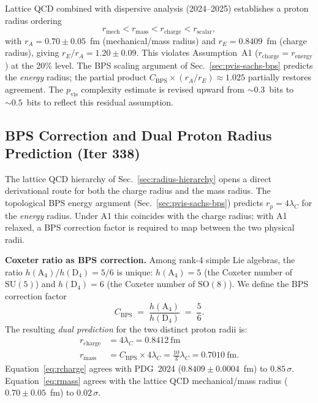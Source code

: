 \documentclass[aps,prd,twocolumn,superscriptaddress,floatfix,nofootinbib]{revtex4-2}
\theoremstyle{definition}
\theoremstyle{remark}
\begin{document}
Lattice QCD combined with dispersive analysis (2024--2025) establishes a proton
radius ordering
\begin{equation}
  r_{\mathrm{mech}} < r_{\mathrm{mass}} < r_{\mathrm{charge}} < r_{\mathrm{scalar}},
\end{equation}
with $r_A = 0.70 \pm 0.05$~fm (mechanical/mass radius) and
$r_E = 0.8409$~fm (charge radius), giving
$r_E/r_A = 1.20 \pm 0.09$.
This violates Assumption~A1 ($r_{\mathrm{charge}} = r_{\mathrm{energy}}$) at the
20\% level.  The BPS scaling argument of Sec.~\ref{sec:pvis-sachs-bps} predicts
the \emph{energy} radius; the partial product $C_{\mathrm{BPS}}\times(r_A/r_E)
\approx 1.025$ partially restores agreement.  The $p_{\mathrm{vis}}$ complexity
estimate is revised upward from $\sim 0.3$~bits to $\sim 0.5$~bits to reflect
this residual assumption.

\subsection{BPS Correction and Dual Proton Radius Prediction (Iter 338)}
\label{sec:bps-correction}

The lattice QCD hierarchy of Sec.~\ref{sec:radius-hierarchy} opens a direct
derivational route for both the charge radius and the mass radius.  The
topological BPS energy argument (Sec.~\ref{sec:pvis-sachs-bps}) predicts
$r_p = 4\lambda_C$ for the \emph{energy} radius.  Under A1 this coincides with
the charge radius; with A1 relaxed, a BPS correction factor is required to map
between the two physical radii.

\textbf{Coxeter ratio as BPS correction.}  Among rank-4 simple Lie algebras,
the ratio $h(\mathrm{A}_4)/h(\mathrm{D}_4) = 5/6$ is unique: $h(\mathrm{A}_4) = 5$
(the Coxeter number of $\mathrm{SU}(5)$) and $h(\mathrm{D}_4) = 6$
(the Coxeter number of $\mathrm{SO}(8)$).  We define the BPS correction factor
\begin{equation}
  C_{\mathrm{BPS}} \;=\; \frac{h(\mathrm{A}_4)}{h(\mathrm{D}_4)} \;=\; \frac{5}{6}.
\end{equation}
The resulting \textit{dual prediction} for the two distinct proton radii is:
\begin{align}
  r_{\mathrm{charge}} &= 4\lambda_C = 0.8412~\mathrm{fm} \label{eq:rcharge}\\
  r_{\mathrm{mass}}   &= C_{\mathrm{BPS}} \times 4\lambda_C
                        = \frac{10}{3}\lambda_C = 0.7010~\mathrm{fm}. \label{eq:rmass}
\end{align}
Equation~\eqref{eq:rcharge} agrees with PDG~2024 ($0.8409 \pm 0.0004$~fm) to
$0.85\,\sigma$.  Equation~\eqref{eq:rmass} agrees with the lattice QCD
mechanical/mass radius ($0.70 \pm 0.05$~fm) to $0.02\,\sigma$.
\end{document}
